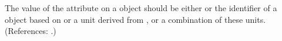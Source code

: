 The value of the attribute  on a \Model object should be
either  or the identifier of a \UnitDefinition object
based on  or a unit derived from
, or a combination of these units.  (References: .)
